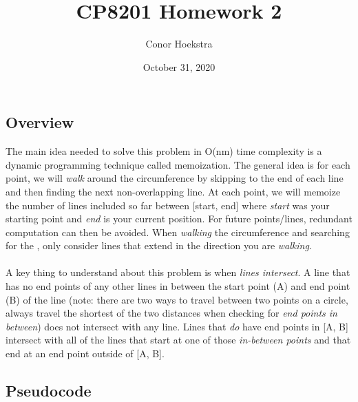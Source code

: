 \documentclass{article}
\title{CP8201 Homework 2}
\author{Conor Hoekstra}
\date{October 31, 2020}
\begin{document}
\maketitle

\section{}

\subsection{Overview}
The main idea needed to solve this problem in O(nm) time complexity is a dynamic programming technique called memoization. The general idea is for each point, we will \textit{walk} around the circumference by skipping to the end of each line and then finding the next non-overlapping line. At each point, we will memoize the number of lines included so far between [start, end] where \textit{start} was your starting point and \textit{end} is your current position. For future points/lines, redundant computation can then be avoided. When \textit{walking} the circumference and searching for the , only consider lines that extend in the direction you are \textit{walking}.

\paragraph{}
A key thing to understand about this problem is when \textit{lines intersect}. A line that has no end points of any other lines in between the start point (A) and end point (B) of the line (note: there are two ways to travel between two points on a circle, always travel the shortest of the two distances when checking for \textit{end points in between}) does not intersect with any line. Lines that \textit{do} have end points in [A, B] intersect with all of the lines that start at one of those \textit{in-between points} and that end at an end point outside of [A, B].

\subsection{Pseudocode}
\end{document}
